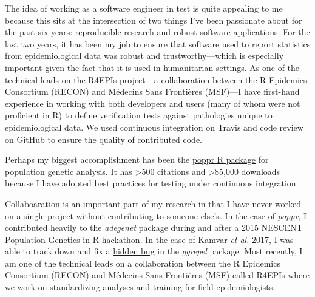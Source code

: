 

The idea of working as a software engineer in test is quite appealing to me
because this sits at the intersection of two things I've been passionate about
for the past six years: reproducible research and robust software applications.
For the last two years, it has been my job to ensure that software used to
report statistics from epidemiological data was robust and trustworthy---which
is especially important given the fact that it is used in humanitarian
settings. As one of the technical leads on the
\href{https://r4epis.netlify.com}{R4EPIs} project---a collaboration between the
R Epidemics Consortium (RECON) and M\'{e}decins Sans Fronti\`{e}res (MSF)---I
have first-hand experience in working with both developers and users (many of
whom were not proficient in R) to define verification tests against pathologies
unique to epidemiological data. We used continuous integration on Travis and
code review on GitHub to ensure the quality of contributed code.

Perhaps my biggest accomplishment has been the
\href{https://grunwaldlab.github.io/poppr}{poppr R package} for population
genetic analysis. It has \textgreater500 citations and \textgreater85,000
downloads because I have adopted best practices for testing under continuous 
integration 


Collaboaration is an important part of my research in that I have never worked
on a single project without contributing to someone else's. In the case of
\textit{poppr}, I contributed heavily to the \textit{adegenet} package during
and after a 2015 NESCENT Population Genetics in R hackathon. In the case of
Kamvar \textit{et al.} 2017, I was able to track down and fix a
\href{https://github.com/slowkow/ggrepel/issues/72}{hidden bug} in the
\textit{ggrepel} package. Most recently, I am one of the technical leads on a
collaboration between the R Epidemics Consortium (RECON) and M\'{e}decins Sans
Fronti\`{e}res (MSF) called R4EPIs where we work on standardizing analyses and
training for field epidemiologists.  

